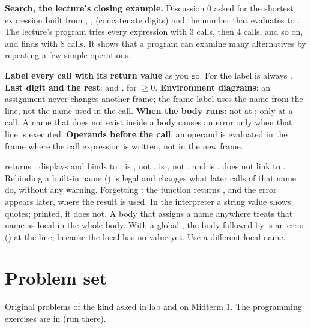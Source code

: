 \documentclass[10pt]{scrartcl}
\begin{document}
\textbf{Search, the lecture's closing example.} Discussion 0 asked for the shortest expression built from , ,  (concatenate digits) and the number  that evaluates to . The lecture's program tries every expression with 3 calls, then 4 calls, and so on, and finds  with 8 calls. It shows that a program can examine many alternatives by repeating a few simple operations.

\begin{shortcuts}
  \ii \textbf{Label every call with its return value} as you go. For  the label is always .
  \ii \textbf{Last digit and the rest}:  and , for  $\ge 0$.
  \ii \textbf{Environment diagrams}: an assignment never changes another frame; the frame label uses the name from the  line, not the name used in the call.
  \ii \textbf{When the body runs}: not at ; only at a call. A name that does not exist inside a body causes an error only when that line is executed.
  \ii \textbf{Operands before the call}: an operand is evaluated in the frame where the call expression is written, not in the new frame.
\end{shortcuts}
\begin{trapbox}
  \ii {} returns .  displays  and binds  to .
  \ii {} is , not .
  \ii {} is , not , and  is .
  \ii {} does not link  to .
  \ii Rebinding a built-in name () is legal and changes what later calls of that name do, without any warning.
  \ii Forgetting : the function returns , and the error appears later, where the result is used.
  \ii In the interpreter a string value shows quotes; printed, it does not.
  \ii A body that assigns a name anywhere treats that name as local in the whole body. With a global \mbox{}, the body  followed by  is an error () at the  line, because the local  has no value yet. Use a different local name.
\end{trapbox}

\clearpage
\section{Problem set}
Original problems of the kind asked in lab and on Midterm 1. The programming exercises are in  (run  there).
\end{document}
